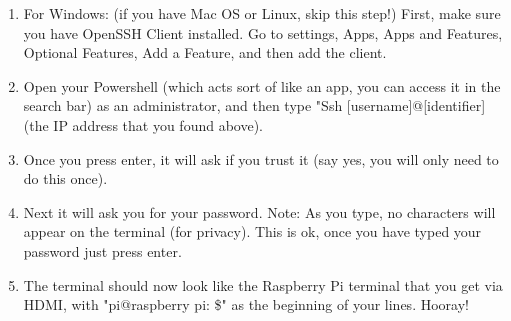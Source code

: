 \documentclass{article}\usepackage[]{graphicx}\usepackage[]{color}
\begin{document}
\begin{enumerate}

\item For Windows: (if you have Mac OS or Linux, skip this step!) First, make sure you have OpenSSH Client installed.  Go to settings, Apps, Apps and Features, Optional Features, Add a Feature, and then add the client.
\item Open your Powershell (which acts sort of like an app, you can access it in the search bar) as an administrator, and then type "Ssh [username]@[identifier] (the IP address that you found above).  
\item Once you press enter, it will ask if you trust it (say yes, you will only need to do this once). 
\item Next it will ask you for your password.  Note: As you type, no characters will appear on the terminal (for privacy).  This is ok, once you have typed your password just press enter.
\item The terminal should now look like the Raspberry Pi terminal that you get via HDMI, with "pi@raspberry pi: \$" as the beginning of your lines.  Hooray!

\end{enumerate}
\end{document}
